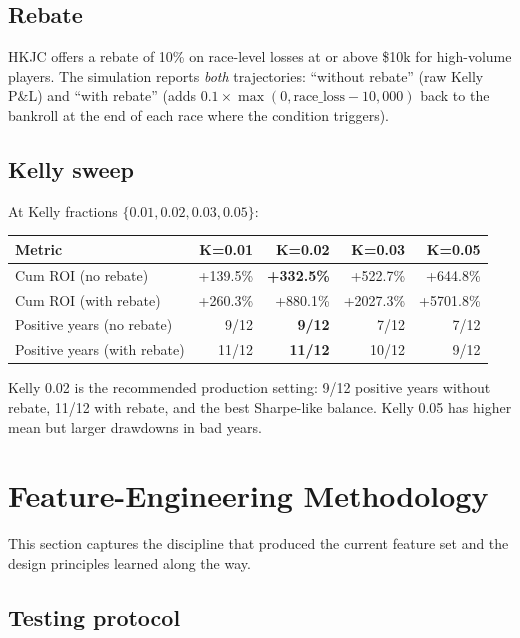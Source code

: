 \documentclass[11pt]{article}
\begin{document}
\subsection{Rebate}

HKJC offers a rebate of 10\% on race-level losses at or above \$10k for
high-volume players. The simulation reports \emph{both} trajectories:
``without rebate'' (raw Kelly P\&L) and ``with rebate'' (adds
$0.1 \times \max(0,\text{race\_loss} - 10{,}000)$ back to the bankroll
at the end of each race where the condition triggers).

\subsection{Kelly sweep}

At Kelly fractions $\{0.01, 0.02, 0.03, 0.05\}$:

\begin{center}
\begin{tabular}{lrrrr}
\toprule
Metric & K=0.01 & K=0.02 & K=0.03 & K=0.05 \\
\midrule
Cum ROI (no rebate)   & +139.5\% & \textbf{+332.5\%} & +522.7\% & +644.8\% \\
Cum ROI (with rebate) & +260.3\% & +880.1\%          & +2027.3\% & +5701.8\% \\
Positive years (no rebate)   & 9/12 & \textbf{9/12} & 7/12 & 7/12 \\
Positive years (with rebate) & 11/12 & \textbf{11/12} & 10/12 & 9/12 \\
\bottomrule
\end{tabular}
\end{center}

Kelly 0.02 is the recommended production setting: 9/12 positive years
without rebate, 11/12 with rebate, and the best Sharpe-like balance.
Kelly 0.05 has higher mean but larger drawdowns in bad years.

\section{Feature-Engineering Methodology}
\label{sec:methodology}

This section captures the discipline that produced the current feature
set and the design principles learned along the way.

\subsection{Testing protocol}
\end{document}
